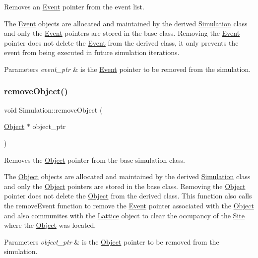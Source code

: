 Removes an \hyperlink{class_event}{Event} pointer from the event list. 

The \hyperlink{class_event}{Event} objects are allocated and maintained by the derived \hyperlink{class_simulation}{Simulation} class and only the \hyperlink{class_event}{Event} pointers are stored in the base class. Removing the \hyperlink{class_event}{Event} pointer does not delete the \hyperlink{class_event}{Event} from the derived class, it only prevents the event from being executed in future simulation iterations. 
\begin{DoxyParams}{Parameters}
{\em event\+\_\+ptr} & is the \hyperlink{class_event}{Event} pointer to be removed from the simulation. \\
\hline
\end{DoxyParams}
\mbox{\label{class_simulation_a39da17feb9b487c05c9a834def44972f}} 
\subsubsection{\texorpdfstring{remove\+Object()}{removeObject()}}
{\footnotesize\ttfamily void Simulation\+::remove\+Object (\begin{DoxyParamCaption}\item[{\hyperlink{class_object}{Object} $\ast$}]{object\+\_\+ptr }\end{DoxyParamCaption})\hspace{0.3cm}{\ttfamily [protected]}}



Removes the \hyperlink{class_object}{Object} pointer from the base simulation class. 

The \hyperlink{class_object}{Object} objects are allocated and maintained by the derived \hyperlink{class_simulation}{Simulation} class and only the \hyperlink{class_object}{Object} pointers are stored in the base class. Removing the \hyperlink{class_object}{Object} pointer does not delete the \hyperlink{class_object}{Object} from the derived class. This function also calls the remove\+Event function to remove the \hyperlink{class_event}{Event} pointer associated with the \hyperlink{class_object}{Object} and also communites with the \hyperlink{class_lattice}{Lattice} object to clear the occupancy of the \hyperlink{class_site}{Site} where the \hyperlink{class_object}{Object} was located. 
\begin{DoxyParams}{Parameters}
{\em object\+\_\+ptr} & is the \hyperlink{class_object}{Object} pointer to be removed from the simulation. \\
\hline
\end{DoxyParams}
\mbox{\label{class_simulation_a122928940c1301d71f19700b574f9e37}} 
